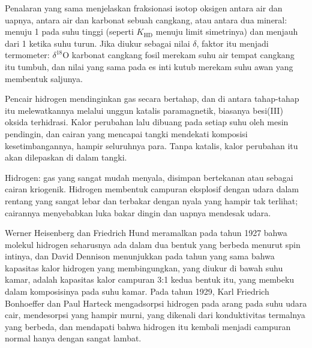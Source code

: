 Penalaran yang sama menjelaskan fraksionasi isotop oksigen antara air dan
uapnya, antara air dan karbonat sebuah cangkang, atau antara dua mineral:
 menuju 1 pada suhu tinggi (seperti $K_{\mathrm{HD}}$ menuju
limit simetrinya) dan menjauh dari 1 ketika suhu turun. Jika diukur sebagai
nilai $\delta$, faktor itu menjadi termometer: $\delta^{18}$O karbonat cangkang
fosil merekam suhu air tempat cangkang itu tumbuh, dan nilai yang sama pada
es inti kutub merekam suhu awan yang membentuk saljunya.

\begin{inthelab}
Pencair hidrogen mendinginkan gas secara bertahap, dan di antara tahap-tahap
itu melewatkannya melalui unggun katalis paramagnetik, biasanya besi(III)
oksida terhidrasi. Kalor perubahan lalu dibuang pada setiap suhu oleh mesin
pendingin, dan cairan yang mencapai tangki mendekati komposisi
kesetimbangannya, hampir seluruhnya para. Tanpa katalis, kalor perubahan itu
akan dilepaskan di dalam tangki.
\end{inthelab}

\begin{safety}{}
Hidrogen: gas yang sangat mudah menyala, disimpan bertekanan atau sebagai
cairan kriogenik. Hidrogen membentuk campuran eksplosif dengan udara dalam
rentang yang sangat lebar dan terbakar dengan nyala yang hampir tak terlihat;
cairannya menyebabkan luka bakar dingin dan uapnya mendesak udara.
\end{safety}

\begin{history}
Werner Heisenberg dan Friedrich Hund meramalkan pada tahun 1927 bahwa molekul
hidrogen seharusnya ada dalam dua bentuk yang berbeda menurut spin intinya,
dan David Dennison menunjukkan pada tahun yang sama bahwa kapasitas kalor
hidrogen yang membingungkan, yang diukur di bawah suhu kamar, adalah kapasitas
kalor campuran 3:1 kedua bentuk itu, yang membeku dalam komposisinya pada
suhu kamar. Pada tahun 1929, Karl Friedrich Bonhoeffer dan Paul Harteck
mengadsorpsi hidrogen pada arang pada suhu udara cair, mendesorpsi  yang hampir murni, yang dikenali dari konduktivitas termalnya yang
berbeda, dan mendapati bahwa hidrogen itu kembali menjadi campuran normal
hanya dengan sangat lambat.
\end{history}

